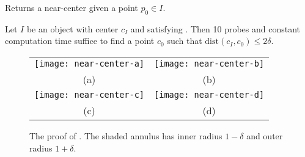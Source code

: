 \documentclass[11pt]{article}
\newcommand{\dist}{\mathrm{dist}}
\begin{document}
\begin{procedure}
\caption{Returns a near-center given a point $p_0\in I$.}
\begin{proceduric}[1]
\end{proceduric}
\end{procedure}

\begin{thm}
Let $I$ be an object with center $c_I$ and satisfying .
Then 10 probes and constant computation time suffice to find a point
$c_0$ such that $\dist(c_I,c_0)\le 2\delta$.
\end{thm}


\begin{figure}
\begin{center}\begin{tabular}{cc}
\texttt{[image: near-center-a]} & \texttt{[image: near-center-b]} \\
(a) & (b) \\
\texttt{[image: near-center-c]} & \texttt{[image: near-center-d]} \\
(c) & (d) \\
\end{tabular}\end{center}
\caption{The proof of .  The shaded annulus has
inner radius $1-\delta$ and outer radius $1+\delta$.}
\end{figure}
\end{document}
